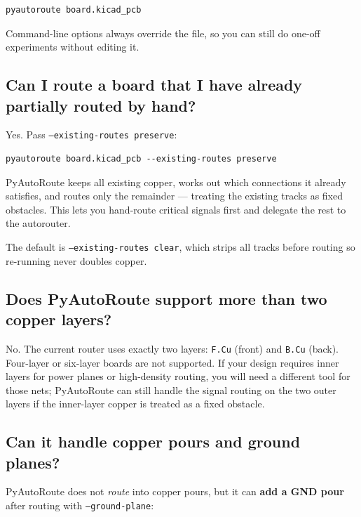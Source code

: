 \documentclass[11pt,a4paper]{article}
\begin{document}
\begin{lstlisting}
pyautoroute board.kicad_pcb
\end{lstlisting}

Command-line options always override the file, so you can still do
one-off experiments without editing it.

\subsection*{Can I route a board that I have already partially routed by hand?}

Yes. Pass \texttt{--existing-routes preserve}:

\begin{lstlisting}
pyautoroute board.kicad_pcb --existing-routes preserve
\end{lstlisting}

PyAutoRoute keeps all existing copper, works out which connections it
already satisfies, and routes only the remainder --- treating the
existing tracks as fixed obstacles. This lets you hand-route critical
signals first and delegate the rest to the autorouter.

The default is \texttt{--existing-routes clear}, which strips all tracks
before routing so re-running never doubles copper.

\subsection*{Does PyAutoRoute support more than two copper layers?}

No. The current router uses exactly two layers: \texttt{F.Cu} (front)
and \texttt{B.Cu} (back). Four-layer or six-layer boards are not
supported. If your design requires inner layers for power planes or
high-density routing, you will need a different tool for those nets;
PyAutoRoute can still handle the signal routing on the two outer layers
if the inner-layer copper is treated as a fixed obstacle.

\subsection*{Can it handle copper pours and ground planes?}

PyAutoRoute does not \emph{route} into copper pours, but it can
\textbf{add a GND pour} after routing with \texttt{--ground-plane}:
\end{document}
